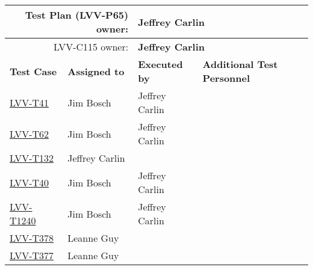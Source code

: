 \documentclass[DM,lsstdraft,STR,toc]{lsstdoc}
\begin{document}
\begin{longtable}{p{3cm}p{3cm}p{3cm}p{6cm}}
\hline
\multicolumn{2}{r}{Test Plan (LVV-P65) owner:} &
\multicolumn{2}{l}{\textbf{ Jeffrey Carlin } }\\\hline
\multicolumn{2}{r}{ LVV-C115 owner:} &
\multicolumn{2}{l}{\textbf{
    Jeffrey Carlin
}
} \\\hline
\textbf{Test Case} & \textbf{Assigned to} & \textbf{Executed by} & \textbf{Additional Test Personnel} \\ \hline
\href{https://jira.lsstcorp.org/secure/Tests.jspa#/testCase/LVV-T41}{LVV-T41}
& {\small Jim Bosch } & {\small Jeffrey Carlin } &
\begin{minipage}[]{6cm}
\smallskip
{\small  }
\medskip
\end{minipage}
\\ \hline
\href{https://jira.lsstcorp.org/secure/Tests.jspa#/testCase/LVV-T62}{LVV-T62}
& {\small Jim Bosch } & {\small Jeffrey Carlin } &
\begin{minipage}[]{6cm}
\smallskip
{\small  }
\medskip
\end{minipage}
\\ \hline
\href{https://jira.lsstcorp.org/secure/Tests.jspa#/testCase/LVV-T132}{LVV-T132}
& {\small Jeffrey Carlin } & {\small  } &
\begin{minipage}[]{6cm}
\smallskip
{\small  }
\medskip
\end{minipage}
\\ \hline
\href{https://jira.lsstcorp.org/secure/Tests.jspa#/testCase/LVV-T40}{LVV-T40}
& {\small Jim Bosch } & {\small Jeffrey Carlin } &
\begin{minipage}[]{6cm}
\smallskip
{\small  }
\medskip
\end{minipage}
\\ \hline
\href{https://jira.lsstcorp.org/secure/Tests.jspa#/testCase/LVV-T1240}{LVV-T1240}
& {\small Jim Bosch } & {\small Jeffrey Carlin } &
\begin{minipage}[]{6cm}
\smallskip
{\small  }
\medskip
\end{minipage}
\\ \hline
\href{https://jira.lsstcorp.org/secure/Tests.jspa#/testCase/LVV-T378}{LVV-T378}
& {\small Leanne Guy } & {\small  } &
\begin{minipage}[]{6cm}
\smallskip
{\small  }
\medskip
\end{minipage}
\\ \hline
\href{https://jira.lsstcorp.org/secure/Tests.jspa#/testCase/LVV-T377}{LVV-T377}
& {\small Leanne Guy } & {\small  } &

\end{longtable}
\end{document}
